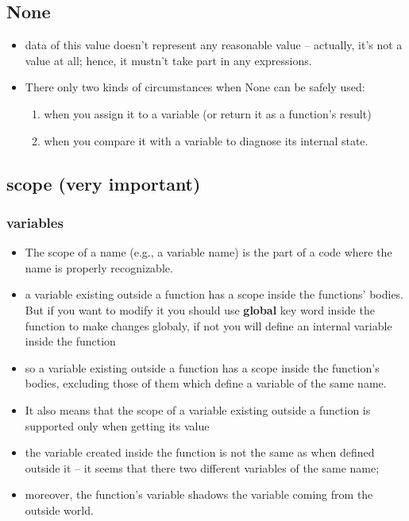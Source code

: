 \documentclass[11pt]{article}
\begin{document}
\subsection{None}
\label{sec:orgf919b5e}
\begin{itemize}
\item data of this value doesn’t represent any reasonable value –
actually, it’s not a value at all; hence, it mustn’t take part in
any expressions.
\item There only two kinds of circumstances when None can be safely used:
\begin{enumerate}
\item when you assign it to a variable (or return it as a function’s
result)
\item when you compare it with a variable to diagnose its internal state.
\end{enumerate}
\end{itemize}
\subsection{scope (very important)}
\label{sec:org5fc7dae}
\subsubsection{variables}
\label{sec:orgb95d519}
\begin{itemize}
\item The scope of a name (e.g., a variable name) is the part of a code
where the name is properly recognizable.
\item a variable existing outside a function has a scope inside the
functions’ bodies. But if you want to modify it you should use
\textbf{global} key word inside the function to make changes globaly, if not
you will define an internal variable inside the function
\item so a variable existing outside a function has a scope inside the
function’s bodies, excluding those of them which define a variable
of the same name.
\item It also means that the scope of a variable existing outside a
function is supported only when getting its value
\item the variable created inside the function is not the same as when
defined outside it – it seems that there two different variables of
the same name;
\item moreover, the function’s variable shadows the variable coming from
the outside world.
\end{itemize}
\end{document}
